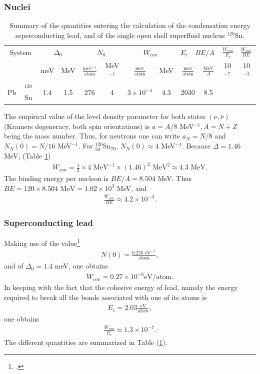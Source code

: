 \begin{subappendices}
\subsubsection{Nuclei}
\begin{table}
	\begin{tabular}{|c|c|c|c|c|c|c|c|c|c|c|c|}
		\hline
		\multicolumn{2}{|c|}{System} & \multicolumn{2}{|c|}{$\Delta_0$} &
		\multicolumn{2}{|c|}{$N_0$}&
		\multicolumn{2}{|c|}{$W_{con}$} &
		\multicolumn{2}{|c|}{$E_c\quad BE/A$} &
		\multicolumn{2}{|c|}{$\frac{W_{con}}{E_c}\quad \frac{W_{con}}{BE}$} \\
		\cline{3-12}
		\multicolumn{2}{|c|}{}& meV&MeV&$\frac{\text{mev}^{-1}}{\text{atom}}$&MeV$^{-1}$&$\frac{\text{mev}}{\text{atom}}$&MeV&$\frac{\text{mev}}{\text{atom}}$&$\frac{\text{MeV}}{A}$&10$^{-7}$&10$^{-3}$\\
		\cline{1-10}
		Pb&$^{120}$Sn& 1.4&1.5&276&4&$3\times10^{-4}$&4.3&2030&8.5&& \\
		\hline
	\end{tabular}\caption{Summary of the quantities entering the calculation of the condensation energy seperconducting lead, and of the single open shell superfluid nucleus $^{120}$Sn.}\label{Tab3.A.1}
\end{table}
The empirical value of the level density parameter for both states $(\nu,\bar \nu)$ (Kramers degeneracy, both spin orientations) is $a=A/8$ MeV$^{-1}, A=N+Z$ being the mass number. Thus, for neutrons one can write $a_N=N/8$ and $N_N(0)=N/16$ MeV$^{-1}$. For $^{120}_{50}$Sn$_{70}$, $N_N(0)\approx 4$ MeV$^{-1}$. Because $\Delta=1.46$ MeV, (Table \ref{Tab3.A.1})
\begin{align}\label{eqC3AppA3}
W_{con}=\frac{1}{2}\times 4\text{ MeV}^{-1}\times (1.46)^2\text{ MeV}^2\approx 4.3\text{ MeV}.
\end{align}
The binding energy per nucleon is $BE/A=8.504$ MeV. Thus $BE=120\times 8.504\text{ MeV}=1.02\times10^{3}$ MeV, and
\begin{align}\label{eqC3AppA4}
\frac{W_{con}}{BE}\approx 4.2\times10^{-3}.
\end{align}
\subsubsection{Superconducting lead}
Making use of the value\footnote{\cite{Beck:70}.}
\begin{align}\label{eqC3AppA5}
N(0)=\frac{0.276\text{ eV}^{-1}}{\text{atom}},
\end{align}
and of $\Delta_0=1.4$ meV, one obtains
\begin{align}\label{eqC3AppA6}
W_{con}=0.27\times10^{-6}\text{eV/atom}.
\end{align}
In keeping with the fact that the cohesive energy of lead, namely the energy required to break all the bonds associated with one of its atoms is
\begin{align}\label{eqC3AppA7}
E_c=2.03\frac{\text{eV}}{{atom}},
\end{align}
one obtains
\begin{align}\label{eqC3AppA8}
\frac{W_{con}}{E_c}\approx1.3\times10^{-7}.
\end{align}
The different quantities are summarized in Table (\ref{Tab3.A.1}).

\end{subappendices}
